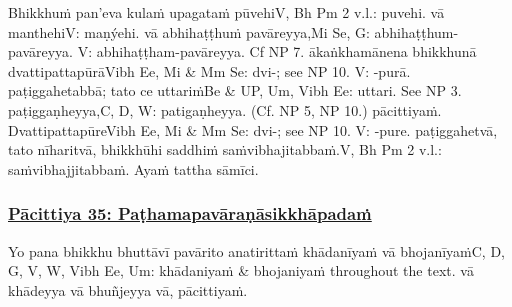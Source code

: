 Bhikkhuṁ pan'eva kulaṁ upagataṁ pūvehi\makeatletter\hyperlink{endnote-appendix}\makeatother V, Bh Pm 2 v.l.: puvehi. vā manthehi\makeatletter\hyperlink{endnote-appendix}\makeatother V: maṇýehi. vā abhihaṭṭhuṁ pavāreyya,\makeatletter\hyperlink{endnote-appendix}\makeatother Mi Se, G: abhihaṭṭhum-pavāreyya. V: abhihaṭṭham-pavāreyya. Cf NP 7. ākaṅkhamānena bhikkhunā dvattipattapūrā\makeatletter\hyperlink{endnote-appendix}\makeatother Vibh Ee, Mi & Mm Se: dvi-; see NP 10. V: -purā. paṭiggahetabbā; tato ce uttariṁ\makeatletter\hyperlink{endnote-appendix}\makeatother Be & UP, Um, Vibh Ee: uttari. See NP 3. paṭiggaṇheyya,\makeatletter\hyperlink{endnote-appendix}\makeatother  C, D, W: patigaṇheyya. (Cf. NP 5, NP 10.) pācittiyaṁ. Dvattipattapūre\makeatletter\hyperlink{endnote-appendix}\makeatother Vibh Ee, Mi & Mm Se: dvi-; see NP 10. V: -pure. paṭiggahetvā, tato nīharitvā, bhikkhūhi saddhiṁ saṁvibhajitabbaṁ.\makeatletter\hyperlink{endnote-appendix}\makeatother V, Bh Pm 2 v.l.: saṁvibhajjitabbaṁ. Ayaṁ tattha sāmīci.



\subsubsection*{\hyperref[exp35]{Pācittiya 35: Paṭhamapavāraṇāsikkhāpadaṁ}}
\label{pac35}

Yo pana bhikkhu bhuttāvī pavārito anatirittaṁ khādanīyaṁ vā bhojanīyaṁ\makeatletter\hyperlink{endnote-appendix}\makeatother C, D, G, V, W, Vibh Ee, Um: khādaniyaṁ & bhojaniyaṁ throughout the text. vā khādeyya vā bhuñjeyya vā, pācittiyaṁ.



